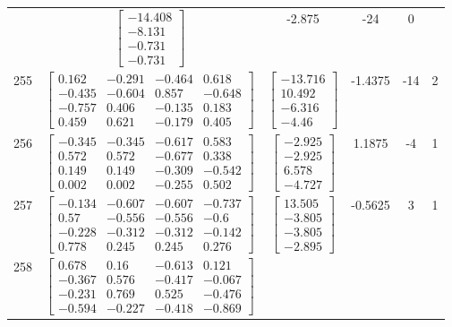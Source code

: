 \documentclass[a4paper,12pt]{article}
\begin{document}
\begin{tabular}{c c c c c c}
&
$\begin{bmatrix} -14.408 \\ -8.131 \\ -0.731 \\ -0.731 \end{bmatrix}$
&
-2.875
&
-24
&
0
\\
255
&
$\begin{bmatrix} 0.162 & -0.291 & -0.464 & 0.618 \\ -0.435 & -0.604 & 0.857 & -0.648 \\ -0.757 & 0.406 & -0.135 & 0.183 \\ 0.459 & 0.621 & -0.179 & 0.405 \end{bmatrix}$
&
$\begin{bmatrix} -13.716 \\ 10.492 \\ -6.316 \\ -4.46 \end{bmatrix}$
&
-1.4375
&
-14
&
2
\\
256
&
$\begin{bmatrix} -0.345 & -0.345 & -0.617 & 0.583 \\ 0.572 & 0.572 & -0.677 & 0.338 \\ 0.149 & 0.149 & -0.309 & -0.542 \\ 0.002 & 0.002 & -0.255 & 0.502 \end{bmatrix}$
&
$\begin{bmatrix} -2.925 \\ -2.925 \\ 6.578 \\ -4.727 \end{bmatrix}$
&
1.1875
&
-4
&
1
\\
257
&
$\begin{bmatrix} -0.134 & -0.607 & -0.607 & -0.737 \\ 0.57 & -0.556 & -0.556 & -0.6 \\ -0.228 & -0.312 & -0.312 & -0.142 \\ 0.778 & 0.245 & 0.245 & 0.276 \end{bmatrix}$
&
$\begin{bmatrix} 13.505 \\ -3.805 \\ -3.805 \\ -2.895 \end{bmatrix}$
&
-0.5625
&
3
&
1
\\
258
&
$\begin{bmatrix} 0.678 & 0.16 & -0.613 & 0.121 \\ -0.367 & 0.576 & -0.417 & -0.067 \\ -0.231 & 0.769 & 0.525 & -0.476 \\ -0.594 & -0.227 & -0.418 & -0.869 \end{bmatrix}$

\end{tabular}
\end{document}
